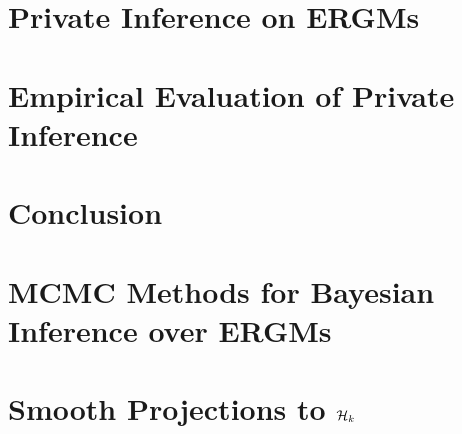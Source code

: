 \documentclass[12pt]{report}
\begin{document}
	
	\chapter{Private Inference on ERGMs}\label{ch:dp_stats}
	
	
	
	
	\chapter{Empirical Evaluation of Private Inference}\label{ch:experiments}
	
	
	
	\chapter{Conclusion}\label{conclusion}
	
	
	
	\cleardoublepage
	
	\nocite{*}
	\printbibliography	
	
	
		
		\appendix
		
		\chapter{MCMC Methods for Bayesian Inference over ERGMs}\label{appendix_mcmc}
		
		
		
		\chapter{Smooth Projections to $\mathcal{H}_k$}\label{appendix_projections}
		
		
	
\end{document}
